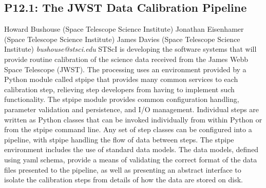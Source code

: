 \documentclass{report}
\begin{document}
\subsection*{P12.1: The JWST Data Calibration Pipeline}
\bigskip
Howard Bushouse (Space Telescope Science Institute) \newline Jonathan Eisenhamer (Space Telescope Science Institute) \newline  James Davies (Space Telescope Science Institute)\newline   \newline  \newline  \newline\newline
{\it bushouse@stsci.edu}\newline
\newline\newline
STScI is developing the software systems that will provide routine calibration of the science data received from the James Webb Space Telescope (JWST). The processing uses an environment provided by a Python module called stpipe that
provides many common services to each calibration step, relieving step developers from having to implement such functionality. The stpipe module provides common configuration handling, parameter validation and persistence, and I/O management. Individual steps are written as Python classes that can be invoked individually from within Python or from the stpipe command line. Any set of step classes can be configured into a pipeline, with stpipe handling the flow of data between steps. The stpipe environment includes the use of standard data models. The data models, defined using yaml schema, provide a means of validating the correct format of the data files presented to the pipeline, as well as presenting an abstract interface to isolate the calibration steps from details of how the data are stored on disk.\newline
\newpage
\end{document}
